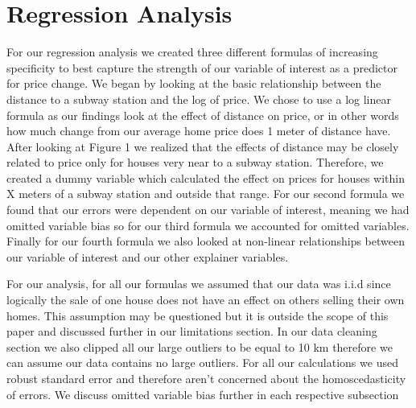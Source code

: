 \section{Regression Analysis}
\label{sec:regression_analysis}

For our regression analysis we created three different formulas of increasing specificity to best capture the strength of our variable of interest as a predictor for price change. We began by looking at the basic relationship between the distance to a subway station and the log of price. We chose to use a log linear formula as our findings look at the effect of distance on price, or in other words how much change from our average home price does 1 meter of distance have. After looking at Figure 1 we realized that the effects of distance may be closely related to price only for houses very near to a subway station. Therefore, we created a dummy variable which calculated the effect on prices for houses within X meters of a subway station and outside that range. For our second formula we found that our errors were dependent on our variable of interest, meaning we had omitted variable bias so for our third formula we accounted for omitted variables. Finally for our fourth formula we also looked at non-linear relationships between our variable of interest and our other explainer variables.

For our analysis, for all our formulas we assumed that our data was i.i.d since 
logically the sale of one house does not have an effect on others selling their own homes.
 This assumption may be questioned but it is outside the scope of this paper and discussed further in our limitations section.
 In our data cleaning section we also clipped all our large outliers to be equal to 10 km therefore we can assume our data contains no large outliers.
  For all our calculations we used robust standard error and therefore aren’t concerned about the homoscedasticity of errors.
   We discuss omitted variable bias further in each respective subsection

